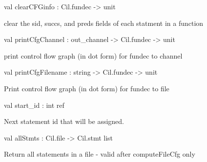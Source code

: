 \documentclass[11pt]{article}
\begin{document}
\label{val:Cfg.clearCFGinfo}\begin{ocamldoccode}
val clearCFGinfo : Cil.fundec -> unit
\end{ocamldoccode}
\begin{ocamldocdescription}
clear the sid, succs, and preds fields of each statment in a function


\end{ocamldocdescription}




\label{val:Cfg.printCfgChannel}\begin{ocamldoccode}
val printCfgChannel : out_channel -> Cil.fundec -> unit
\end{ocamldoccode}
\begin{ocamldocdescription}
print control flow graph (in dot form) for fundec to channel


\end{ocamldocdescription}




\label{val:Cfg.printCfgFilename}\begin{ocamldoccode}
val printCfgFilename : string -> Cil.fundec -> unit
\end{ocamldoccode}
\begin{ocamldocdescription}
Print control flow graph (in dot form) for fundec to file


\end{ocamldocdescription}




\label{val:Cfg.start-underscoreid}\begin{ocamldoccode}
val start_id : int ref
\end{ocamldoccode}
\begin{ocamldocdescription}
Next statement id that will be assigned.


\end{ocamldocdescription}




\label{val:Cfg.allStmts}\begin{ocamldoccode}
val allStmts : Cil.file -> Cil.stmt list
\end{ocamldoccode}
\begin{ocamldocdescription}
Return all statements in a file - valid after computeFileCfg only


\end{ocamldocdescription}
\end{document}
